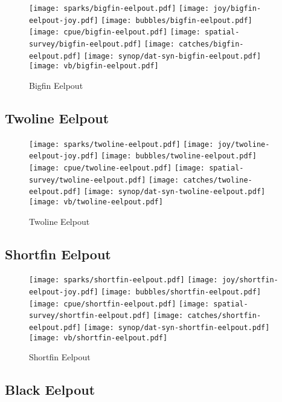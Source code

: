 \begin{figure}[htbp]
\centering
\texttt{[image: sparks/bigfin-eelpout.pdf]}
\texttt{[image: joy/bigfin-eelpout-joy.pdf]}
\texttt{[image: bubbles/bigfin-eelpout.pdf]}
\texttt{[image: cpue/bigfin-eelpout.pdf]}
\texttt{[image: spatial-survey/bigfin-eelpout.pdf]}
\texttt{[image: catches/bigfin-eelpout.pdf]}
\texttt{[image: synop/dat-syn-bigfin-eelpout.pdf]}
\texttt{[image: vb/bigfin-eelpout.pdf]}
\caption{Bigfin Eelpout}
\end{figure}
\clearpage
\subsection*{Twoline Eelpout}

\begin{figure}[htbp]
\centering
\texttt{[image: sparks/twoline-eelpout.pdf]}
\texttt{[image: joy/twoline-eelpout-joy.pdf]}
\texttt{[image: bubbles/twoline-eelpout.pdf]}
\texttt{[image: cpue/twoline-eelpout.pdf]}
\texttt{[image: spatial-survey/twoline-eelpout.pdf]}
\texttt{[image: catches/twoline-eelpout.pdf]}
\texttt{[image: synop/dat-syn-twoline-eelpout.pdf]}
\texttt{[image: vb/twoline-eelpout.pdf]}
\caption{Twoline Eelpout}
\end{figure}
\clearpage
\subsection*{Shortfin Eelpout}

\begin{figure}[htbp]
\centering
\texttt{[image: sparks/shortfin-eelpout.pdf]}
\texttt{[image: joy/shortfin-eelpout-joy.pdf]}
\texttt{[image: bubbles/shortfin-eelpout.pdf]}
\texttt{[image: cpue/shortfin-eelpout.pdf]}
\texttt{[image: spatial-survey/shortfin-eelpout.pdf]}
\texttt{[image: catches/shortfin-eelpout.pdf]}
\texttt{[image: synop/dat-syn-shortfin-eelpout.pdf]}
\texttt{[image: vb/shortfin-eelpout.pdf]}
\caption{Shortfin Eelpout}
\end{figure}
\clearpage
\subsection*{Black Eelpout}

